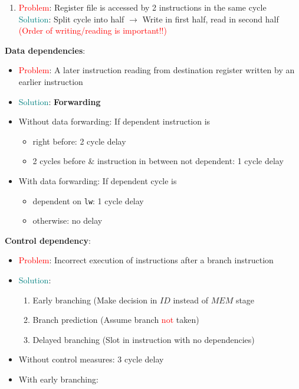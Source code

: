 \documentclass[a4paper]{article} \usepackage[backend=biber, style=numeric, sorting=none]{biblatex}
\begin{document}
\begin{multicols*}{4}
\begin{enumerate}[leftmargin=*]
        \item \textcolor{red}{Problem}: Register file is accessed by 2 instructions in the same cycle
        \\\textcolor{teal}{Solution}: Split cycle into half $\rightarrow$ Write in first half, read in second half \textcolor{red}{(Order of writing/reading is important!!)}\\
    \end{enumerate}
\textbf{Data dependencies}:
\begin{itemize}
    \item \textcolor{red}{Problem}: A later instruction reading from destination register written by an earlier instruction
    \item \textcolor{teal}{Solution}: \textbf{Forwarding}
    \item Without data forwarding: If dependent instruction is
    \begin{itemize}
        \item right before: 2 cycle delay
        \item 2 cycles before \& instruction in between not dependent: 1 cycle delay
    \end{itemize}
\item With data forwarding: If dependent cycle is
    \begin{itemize}
        \item dependent on \texttt{lw}: 1 cycle delay
        \item otherwise: no delay\\
    \end{itemize}
\end{itemize}
\vfill\null
\columnbreak
\textbf{Control dependency}:
\begin{itemize}
    \item \textcolor{red}{Problem}: Incorrect execution of instructions after a branch instruction
    \item \textcolor{teal}{Solution}: \begin{enumerate}[leftmargin=*]
        \item Early branching (Make decision in $ID$ instead of $MEM$ stage
        \item Branch prediction (Assume branch \textcolor{red}{not} taken)
        \item Delayed branching (Slot in instruction with no dependencies)
    \end{enumerate}
    \item Without control measures: 3 cycle delay
    \item With early branching:

\end{itemize}
\end{multicols*}
\end{document}
